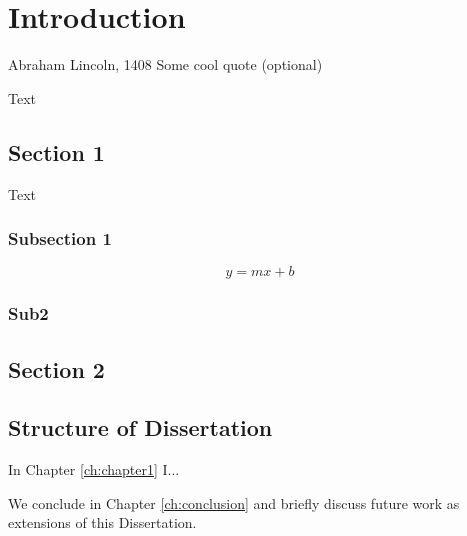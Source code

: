 \chapter[Introduction]{Introduction}
\label{ch:intro}
\vspace{-16pt} \begin{chapquote}{Abraham Lincoln, 1408} \singlespacing Some cool quote (optional)
\end{chapquote} \vspace{-8pt}
\noindent\makebox[\linewidth]{\rule{0.5\textwidth}{0.5pt}} \vspace{1pt}


%

Text

\section{Section 1}\label{sec:section1}

Text

\subsection{Subsection 1}\label{sec:ss1}

\begin{equation}
y = mx + b
\end{equation}


\subsection{Sub2}\label{sec:sub2}

\section{Section 2}\label{sec:section2}

\section{Structure of Dissertation}\label{sec:structure}

In Chapter \ref{ch:chapter1} I...


We conclude in Chapter \ref{ch:conclusion} and briefly discuss future work as extensions of this Dissertation.
